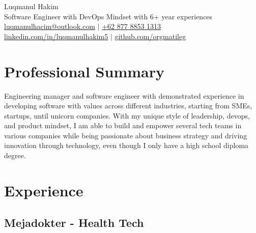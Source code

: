 \documentclass[11pt]{article}
\begin{document}
\begin{center}
    {\fontsize{36}{36}\selectfont \interheavy Luqmanul Hakim} \\ \bigskip
    {\color{gray}\fontsize{13}{13}\selectfont Software Engineer with DevOps Mindset with 6+ year experiences} \\ \bigskip
    {\color{icnclr}\faEnvelope[regular]} \href{mailto:luqmanulhacim@outlook.com}{luqmanulhacim@outlook.com} $|$
    {\color{icnclr}} \href{tel:+6287788531313}{+62 877 8853 1313}
    \\ {\color{icnclr}\faLinkedinIn} \href{https://www.linkedin.com/in/luqmanulhakim5}{linkedin.com/in/luqmanulhakim5} $|$
    {\color{icnclr}\faGithub} \href{https://github.com/orgmatileg}{github.com/orgmatileg}
\end{center}

\section{Professional Summary}
 {Engineering manager and software engineer with demonstrated experience in developing software with
  values across different industries, starting from SMEs, startups, until unicorn companies. With my unique
  style of leadership, devops, and product mindset, I am able to build and empower several tech teams in
  various companies while being passionate about business strategy and driving innovation through
  technology, even though I only have a high school diploma degree.}


\section{Experience}
\subsection{Mejadokter - Health Tech}
\end{document}
